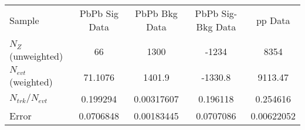 \begin{table}[h!]
\begin{tabular}{|l|c|c|c|c|}
\hline
Sample         & PbPb Sig Data  & PbPb Bkg Data  & PbPb Sig-Bkg Data& pp Data   \\    \\
$N_Z$ (unweighted)& 66             & 1300           & -1234          & 8354           \\
$N_{evt}$ (weighted)& 71.1076        & 1401.9         & -1330.8        & 9113.47        \\
$N_{trk}/N_{evt}$& 0.199294       & 0.00317607     & 0.196118       & 0.254616       \\
Error          & 0.0706848      & 0.00183445     & 0.0707086      & 0.00622052     \\
\hline\hline
\end{tabular}
\end{table}
